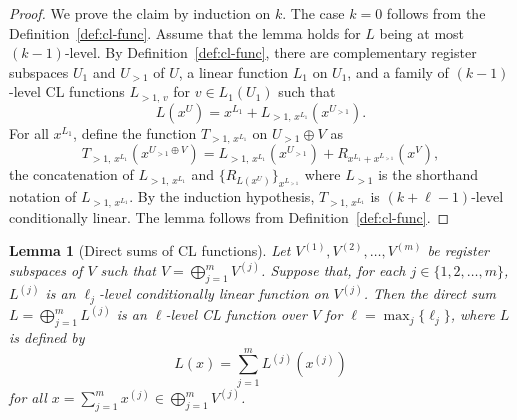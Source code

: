 \documentclass[11pt]{article}
\newtheorem{lemma}[theorem]{Lemma}
\theoremstyle{definition}
\begin{document}
\begin{proof}
  We prove the claim by induction on $k$.
  The case $k = 0$ follows from the Definition~\ref{def:cl-func}.
  Assume that the lemma holds for $L$ being at most $(k-1)$-level.
  By Definition~\ref{def:cl-func}, there are complementary register subspaces
  $U_1$ and $U_{>1}$ of $U$, a linear function $L_1$ on $U_1$, and a family of
  $(k-1)$-level CL functions $L_{>1,\, v}$ for $v \in L_1(U_1)$ such that
  \begin{equation*}
    L(x^U) = x^{L_1} + L_{>1,\, x^{L_1}}(x^{U_{>1}}).
  \end{equation*}
  For all $x^{L_1}$, define the function $T_{>1,\, x^{L_1}}$ on $U_{>1} \oplus V$ as
  \begin{equation*}
    T_{>1,\, x^{L_1}}(x^{U_{>1} \oplus V}) = L_{>1,\, x^{L_1}}(x^{U_{>1}}) +
    R_{x^{L_1} + x^{L_{>1}}}(x^V),
  \end{equation*}
  the concatenation of $L_{>1,\, x^{L_1}}$ and $\{ R_{L(x^U)} \}_{x^{L_{>1}}}$
  where $L_{>1}$ is the shorthand notation of $L_{>1,\, x^{L_1}}$.
  By the induction hypothesis, $T_{>1,\, x^{L_1}}$ is $(k+\ell-1)$-level
  conditionally linear.
  The lemma follows from Definition~\ref{def:cl-func}.
\end{proof}
\begin{lemma}[Direct sums of CL functions]
  \label{lem:cl-func-prod}
  Let $V^{(1)}, V^{(2)}, \ldots, V^{(m)}$ be register subspaces of $V$ such that
  $V = \bigoplus_{j=1}^m V^{(j)}$.
  Suppose that, for each $j\in\{1, 2, \ldots, m\}$, $L^{(j)}$ is an
  $\ell_j$-level conditionally linear function on $V^{(j)}$.
  Then the direct sum $L = \bigoplus_{j=1}^m L^{(j)}$ is an $\ell$-level CL
  function over $V$ for $\ell = \max_j \{\ell_j\}$, where $L$ is defined by
  \begin{equation*}
    L(x) = \sum_{j=1}^m  L^{(j)}(x^{(j)})
  \end{equation*}
  for all $x = \sum_{j=1}^m x^{(j)} \in \bigoplus_{j=1}^m V^{(j)}$.
\end{lemma}
\end{document}
